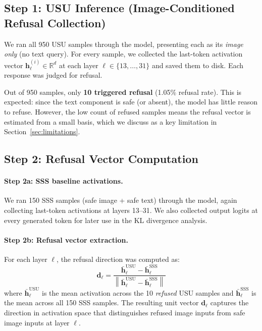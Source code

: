 \documentclass[11pt]{article}
\begin{document}
\subsection{Step 1: USU Inference (Image-Conditioned Refusal Collection)}

We ran all 950 USU samples through the model, presenting each as its \textit{image only} (no text query). For every sample, we collected the last-token activation vector $\mathbf{h}_\ell^{(i)} \in \mathbb{R}^{d}$ at each layer $\ell \in \{13, \ldots, 31\}$ and saved them to disk. Each response was judged for refusal.

Out of 950 samples, only \textbf{10 triggered refusal} (1.05\% refusal rate). This is expected: since the text component is safe (or absent), the model has little reason to refuse. However, the low count of refused samples means the refusal vector is estimated from a small basis, which we discuss as a key limitation in Section~\ref{sec:limitations}.

\subsection{Step 2: Refusal Vector Computation}

\paragraph{Step 2a: SSS baseline activations.} We ran 150 SSS samples (safe image + safe text) through the model, again collecting last-token activations at layers 13--31. We also collected output logits at every generated token for later use in the KL divergence analysis.

\paragraph{Step 2b: Refusal vector extraction.} For each layer $\ell$, the refusal direction was computed as:
\begin{equation}
    \mathbf{d}_\ell = \frac{\bar{\mathbf{h}}_\ell^{\text{USU}} - \bar{\mathbf{h}}_\ell^{\text{SSS}}}{\left\| \bar{\mathbf{h}}_\ell^{\text{USU}} - \bar{\mathbf{h}}_\ell^{\text{SSS}} \right\|}
\end{equation}
where $\bar{\mathbf{h}}_\ell^{\text{USU}}$ is the mean activation across the 10 \textit{refused} USU samples and $\bar{\mathbf{h}}_\ell^{\text{SSS}}$ is the mean across all 150 SSS samples. The resulting unit vector $\mathbf{d}_\ell$ captures the direction in activation space that distinguishes refused image inputs from safe image inputs at layer $\ell$.
\end{document}
